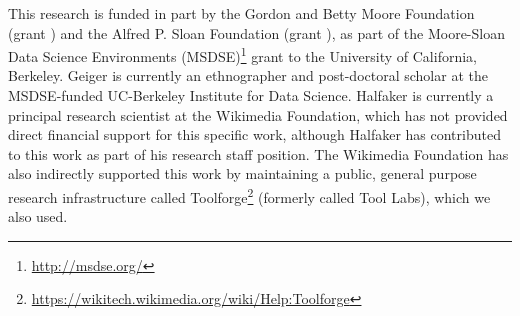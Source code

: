 \documentclass[format=acmsmall, review=false, screen=true]{acmart}%
\begin{document}
This research is funded in part by the Gordon and Betty Moore Foundation (grant ) and the Alfred P. Sloan Foundation (grant ), as part of the Moore-Sloan Data Science Environments (MSDSE)\footnote{ \url{http://msdse.org/}} grant to the University of California, Berkeley. Geiger is currently an ethnographer and post-doctoral scholar at the MSDSE-funded UC-Berkeley Institute for Data Science. Halfaker is currently a principal research scientist at the Wikimedia Foundation, which has not provided direct financial support for this specific work, although Halfaker has contributed to this work as part of his research staff position. The Wikimedia Foundation has also indirectly supported this work by maintaining a public, general purpose research infrastructure called Toolforge\footnote{ \url{https://wikitech.wikimedia.org/wiki/Help:Toolforge}} (formerly called Tool Labs), which we also used.




\end{document}
